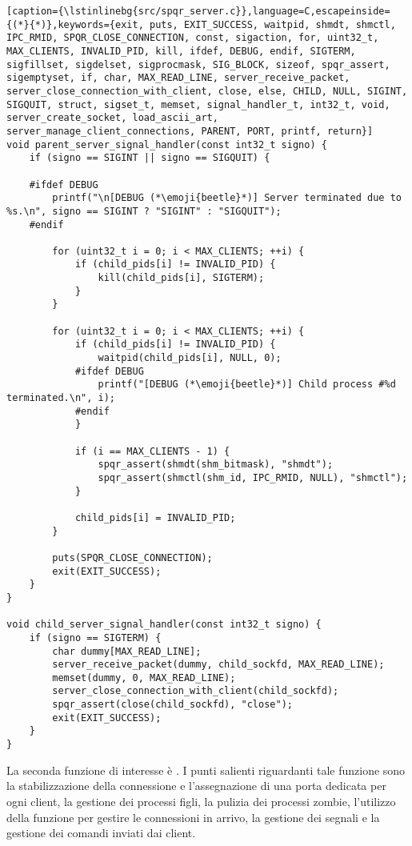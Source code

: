 \begin{lstlisting}[caption={\lstinlinebg{src/spqr_server.c}},language=C,escapeinside={(*}{*)},keywords={exit, puts, EXIT_SUCCESS, waitpid, shmdt, shmctl, IPC_RMID, SPQR_CLOSE_CONNECTION, const, sigaction, for, uint32_t, MAX_CLIENTS, INVALID_PID, kill, ifdef, DEBUG, endif, SIGTERM, sigfillset, sigdelset, sigprocmask, SIG_BLOCK, sizeof, spqr_assert, sigemptyset, if, char, MAX_READ_LINE, server_receive_packet, server_close_connection_with_client, close, else, CHILD, NULL, SIGINT, SIGQUIT, struct, sigset_t, memset, signal_handler_t, int32_t, void, server_create_socket, load_ascii_art, server_manage_client_connections, PARENT, PORT, printf, return}]
void parent_server_signal_handler(const int32_t signo) {
    if (signo == SIGINT || signo == SIGQUIT) {

    #ifdef DEBUG
        printf("\n[DEBUG (*\emoji{beetle}*)] Server terminated due to %s.\n", signo == SIGINT ? "SIGINT" : "SIGQUIT");
    #endif

        for (uint32_t i = 0; i < MAX_CLIENTS; ++i) {
            if (child_pids[i] != INVALID_PID) {
                kill(child_pids[i], SIGTERM);
            }
        }

        for (uint32_t i = 0; i < MAX_CLIENTS; ++i) {
            if (child_pids[i] != INVALID_PID) {
                waitpid(child_pids[i], NULL, 0);
            #ifdef DEBUG
                printf("[DEBUG (*\emoji{beetle}*)] Child process #%d terminated.\n", i);
            #endif
            }

            if (i == MAX_CLIENTS - 1) {
                spqr_assert(shmdt(shm_bitmask), "shmdt");
                spqr_assert(shmctl(shm_id, IPC_RMID, NULL), "shmctl");
            }
            
            child_pids[i] = INVALID_PID;
        }

        puts(SPQR_CLOSE_CONNECTION);
        exit(EXIT_SUCCESS);
    }
}

void child_server_signal_handler(const int32_t signo) {
    if (signo == SIGTERM) {
        char dummy[MAX_READ_LINE];
        server_receive_packet(dummy, child_sockfd, MAX_READ_LINE);
        memset(dummy, 0, MAX_READ_LINE);
        server_close_connection_with_client(child_sockfd);
        spqr_assert(close(child_sockfd), "close");
        exit(EXIT_SUCCESS);
    }
}
\end{lstlisting}

La seconda funzione di interesse è .
I punti salienti riguardanti tale funzione sono la stabilizzazione della connessione e l'assegnazione di una porta dedicata per ogni client, la gestione dei processi figli, la pulizia dei processi zombie, l'utilizzo della funzione  per gestire le connessioni in arrivo, la gestione dei segnali e la gestione dei comandi inviati dai client.

